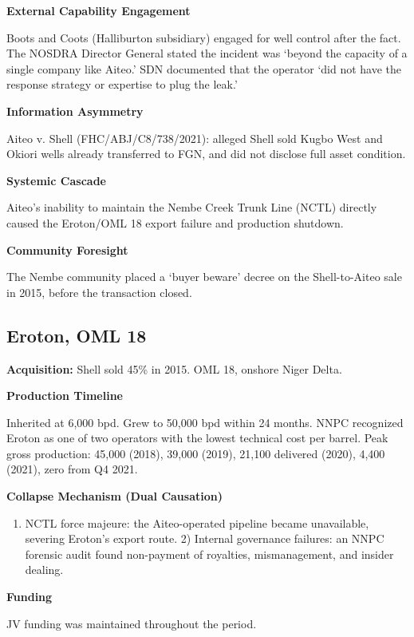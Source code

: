 \textbf{External Capability Engagement}

Boots and Coots (Halliburton subsidiary) engaged for well control after
the fact. The NOSDRA Director General stated the incident was `beyond
the capacity of a single company like Aiteo.' SDN documented that the
operator `did not have the response strategy or expertise to plug the
leak.'

\textbf{Information Asymmetry}

Aiteo v. Shell (FHC/ABJ/C8/738/2021): alleged Shell sold Kugbo West and
Okiori wells already transferred to FGN, and did not disclose full asset
condition.

\textbf{Systemic Cascade}

Aiteo's inability to maintain the Nembe Creek Trunk Line (NCTL) directly
caused the Eroton/OML 18 export failure and production shutdown.

\textbf{Community Foresight}

The Nembe community placed a `buyer beware' decree on the Shell-to-Aiteo
sale in 2015, before the transaction closed.

\hypertarget{eroton-oml-18}{%
\subsection{Eroton, OML 18}\label{eroton-oml-18}}

\textbf{Acquisition:} Shell sold 45\% in 2015. OML 18, onshore Niger
Delta.

\textbf{Production Timeline}

Inherited at 6,000 bpd. Grew to 50,000 bpd within 24 months. NNPC
recognized Eroton as one of two operators with the lowest technical cost
per barrel. Peak gross production: 45,000 (2018), 39,000 (2019), 21,100
delivered (2020), 4,400 (2021), zero from Q4 2021.

\textbf{Collapse Mechanism (Dual Causation)}

\begin{enumerate}
\def\labelenumi{\arabic{enumi})}
\tightlist
\item
  NCTL force majeure: the Aiteo-operated pipeline became unavailable,
  severing Eroton's export route. 2) Internal governance failures: an
  NNPC forensic audit found non-payment of royalties, mismanagement, and
  insider dealing.
\end{enumerate}

\textbf{Funding}

JV funding was maintained throughout the period.

